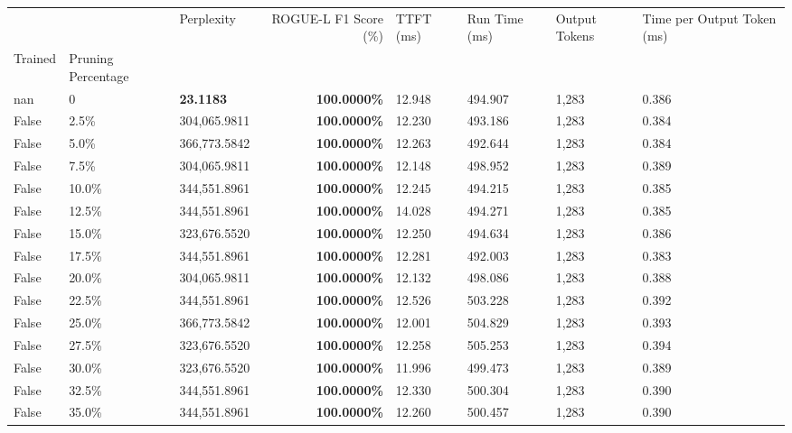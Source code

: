 \begin{table}[H]
\label{tab:evaluation-pipeline-13-untrained}
\begin{tabular}{lllrllll}
\toprule
 &  & Perplexity & ROGUE-L F1 Score (\%) & TTFT (ms) & Run Time (ms) & Output Tokens & Time per Output Token (ms) \\
Trained & Pruning Percentage &  &  &  &  &  &  \\
\midrule
nan & 0 & \bfseries 23.1183 & \bfseries 100.0000\% & 12.948 & 494.907 & 1,283 & 0.386 \\
\cline{1-8}
False & 2.5\% & \color{red} 304,065.9811 & \bfseries \color{red} 100.0000\% & 12.230 & 493.186 & 1,283 & 0.384 \\
\cline{1-8}
False & 5.0\% & 366,773.5842 & \bfseries \color{red} 100.0000\% & 12.263 & 492.644 & 1,283 & 0.384 \\
\cline{1-8}
False & 7.5\% & \color{red} 304,065.9811 & \bfseries \color{red} 100.0000\% & 12.148 & 498.952 & 1,283 & 0.389 \\
\cline{1-8}
False & 10.0\% & 344,551.8961 & \bfseries \color{red} 100.0000\% & 12.245 & 494.215 & 1,283 & 0.385 \\
\cline{1-8}
False & 12.5\% & 344,551.8961 & \bfseries \color{red} 100.0000\% & 14.028 & 494.271 & 1,283 & 0.385 \\
\cline{1-8}
False & 15.0\% & 323,676.5520 & \bfseries \color{red} 100.0000\% & 12.250 & 494.634 & 1,283 & 0.386 \\
\cline{1-8}
False & 17.5\% & 344,551.8961 & \bfseries \color{red} 100.0000\% & 12.281 & 492.003 & 1,283 & 0.383 \\
\cline{1-8}
False & 20.0\% & \color{red} 304,065.9811 & \bfseries \color{red} 100.0000\% & 12.132 & 498.086 & 1,283 & 0.388 \\
\cline{1-8}
False & 22.5\% & 344,551.8961 & \bfseries \color{red} 100.0000\% & 12.526 & 503.228 & 1,283 & 0.392 \\
\cline{1-8}
False & 25.0\% & 366,773.5842 & \bfseries \color{red} 100.0000\% & 12.001 & 504.829 & 1,283 & 0.393 \\
\cline{1-8}
False & 27.5\% & 323,676.5520 & \bfseries \color{red} 100.0000\% & 12.258 & 505.253 & 1,283 & 0.394 \\
\cline{1-8}
False & 30.0\% & 323,676.5520 & \bfseries \color{red} 100.0000\% & 11.996 & 499.473 & 1,283 & 0.389 \\
\cline{1-8}
False & 32.5\% & 344,551.8961 & \bfseries \color{red} 100.0000\% & 12.330 & 500.304 & 1,283 & 0.390 \\
\cline{1-8}
False & 35.0\% & 344,551.8961 & \bfseries \color{red} 100.0000\% & 12.260 & 500.457 & 1,283 & 0.390 \\

\end{tabular}
\end{table}
